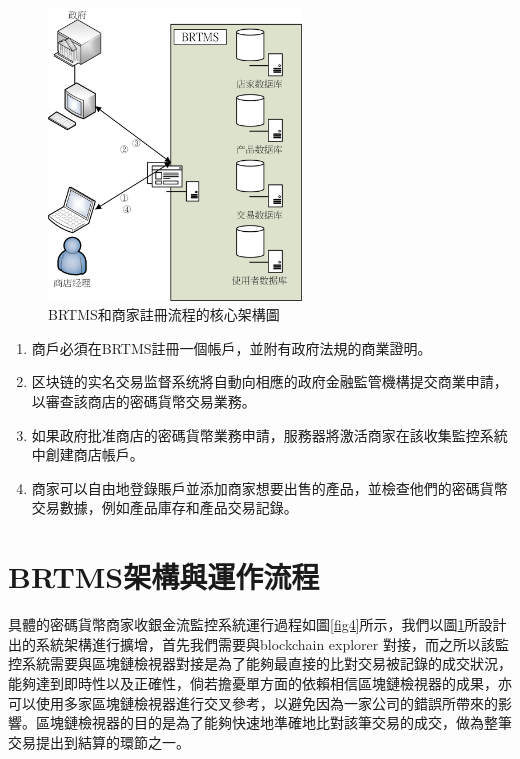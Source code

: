 	\begin{figure}[h]
		\centering
		\includegraphics[width = 0.6\textwidth]{fig3.png}
		\caption{BRTMS和商家註冊流程的核心架構圖}\label{fig3}
	\end{figure}

	\begin{enumerate}
		\item 商戶必須在BRTMS註冊一個帳戶，並附有政府法規的商業證明。
		\item 区块链的实名交易监督系统將自動向相應的政府金融監管機構提交商業申請，以審查該商店的密碼貨幣交易業務。
		\item 如果政府批准商店的密碼貨幣業務申請，服務器將激活商家在該收集監控系統中創建商店帳戶。
		\item 商家可以自由地登錄賬戶並添加商家想要出售的產品，並檢查他們的密碼貨幣交易數據，例如產品庫存和產品交易記錄。
	\end{enumerate}

	\section{BRTMS架構與運作流程}
	具體的密碼貨幣商家收銀金流監控系統運行過程如圖\ref{fig4}所示，我們以圖\ref{fig3}所設計出的系統架構進行擴增，首先我們需要與blockchain explorer 對接，而之所以該監控系統需要與區塊鏈檢視器對接是為了能夠最直接的比對交易被記錄的成交狀況，能夠達到即時性以及正確性，倘若擔憂單方面的依賴相信區塊鏈檢視器的成果，亦可以使用多家區塊鏈檢視器進行交叉參考，以避免因為一家公司的錯誤所帶來的影響。區塊鏈檢視器的目的是為了能夠快速地準確地比對該筆交易的成交，做為整筆交易提出到結算的環節之一。

